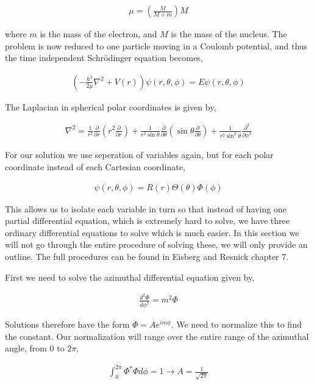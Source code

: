 \documentclass[11pt]{amsart}
\begin{document}
\begin{align*}
  \mu = \left(\frac{M}{M+m}\right) M
\end{align*}

where $m$ is the mass of the electron, and $M$ is the mass of the nucleus. The problem is now reduced to one particle moving in a Coulomb potential, and thus the time independent Schr\"{o}dinger equation becomes,

\begin{align*}
  \left(-\frac{\hbar^2}{2\mu}\nabla^2+V(r)\right)\psi(r,\theta,\phi)=E\psi(r,\theta,\phi)
\end{align*}

The Laplacian in spherical polar coordinates is given by,

\begin{align*}
  \nabla^2=\frac{1}{r^2}\frac{\partial}{\partial r}\left(r^2\frac{\partial}{\partial r}\right)+\frac{1}{r^2\sin{\theta}}\frac{\partial}{\partial\theta}\left(\sin{\theta}\frac{\partial}{\partial\theta}\right)+\frac{1}{r^2\sin^2{\theta}}\frac{\partial^2}{\partial\phi^2}
\end{align*}

For our solution we use seperation of variables again, but for each polar coordinate instead of each Cartesian coordinate,

\begin{align*}
  \psi(r, \theta, \phi) = R(r)\Theta(\theta)\Phi(\phi)
\end{align*}

This allows us to isolate each variable in turn so that instead of having one partial differential equation, which is extremely hard to solve, we have three ordinary differential equations to solve which is much easier. In this section we will not go through the entire procedure of solving these, we will only provide an outline. The full procedures can be found in Eisberg and Resnick chapter 7.

First we need to solve the azimuthal differential equation given by,

\begin{align*}
  \frac{d^2\Phi}{d\phi^2} = m^2\Phi
\end{align*}

Solutions therefore have the form $\Phi = Ae^{im\phi}$. We need to normalize this to find the constant. Our normalization will range over the entire range of the azimuthal angle, from $0$ to $2\pi$,

\begin{align*}
  \int_0^{2\pi}\Phi^*\Phi d\phi = 1 \to A = \frac{1}{\sqrt{2\pi}}
\end{align*}
\end{document}
